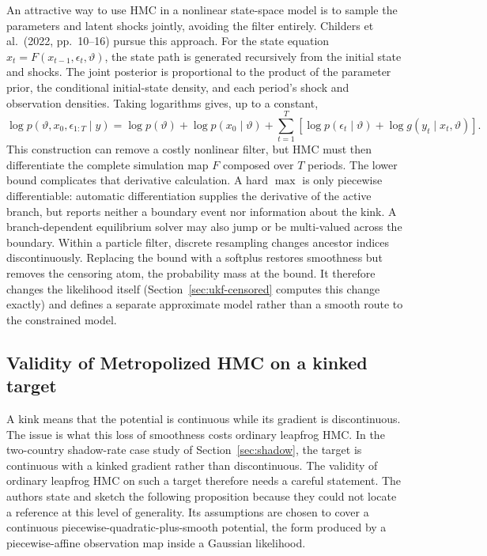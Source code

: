 \documentclass[11pt]{article}
\begin{document}
An attractive way to use HMC in a nonlinear state-space model is to sample the parameters and latent shocks jointly, avoiding the filter entirely. Childers et al.\ (2022, pp.~10--16) pursue this approach. For the state equation $x_t=F(x_{t-1},\epsilon_t,\vartheta)$, the state path is generated recursively from the initial state and shocks. The joint posterior is proportional to the product of the parameter prior, the conditional initial-state density, and each period's shock and observation densities. Taking logarithms gives, up to a constant,
\begin{equation}\label{eq:56}
 \log p(\vartheta,x_0,\epsilon_{1:T}\mid y)
 =\log p(\vartheta)+\log p(x_0\mid\vartheta)
 +\sum_{t=1}^T\left[\log p(\epsilon_t\mid\vartheta)
 +\log g(y_t\mid x_t,\vartheta)\right].
\end{equation}
This construction can remove a costly nonlinear filter, but HMC must then differentiate the complete simulation map $F$ composed over $T$ periods. The lower bound complicates that derivative calculation. A hard $\max$ is only piecewise differentiable: automatic differentiation supplies the derivative of the active branch, but reports neither a boundary event nor information about the kink. A branch-dependent equilibrium solver may also jump or be multi-valued across the boundary. Within a particle filter, discrete resampling changes ancestor indices discontinuously. Replacing the bound with a softplus restores smoothness but removes the censoring atom, the probability mass at the bound. It therefore changes the likelihood itself (Section~\ref{sec:ukf-censored} computes this change exactly) and defines a separate approximate model rather than a smooth route to the constrained model.

\subsection{Validity of Metropolized HMC on a kinked target}\label{sec:kink-validity}

A kink means that the potential is continuous while its gradient is discontinuous. The issue is what this loss of smoothness costs ordinary leapfrog HMC. In the two-country shadow-rate case study of Section~\ref{sec:shadow}, the target is continuous with a kinked gradient rather than discontinuous. The validity of ordinary leapfrog HMC on such a target therefore needs a careful statement. The authors state and sketch the following proposition because they could not locate a reference at this level of generality. Its assumptions are chosen to cover a continuous piecewise-quadratic-plus-smooth potential, the form produced by a piecewise-affine observation map inside a Gaussian likelihood.
\end{document}
